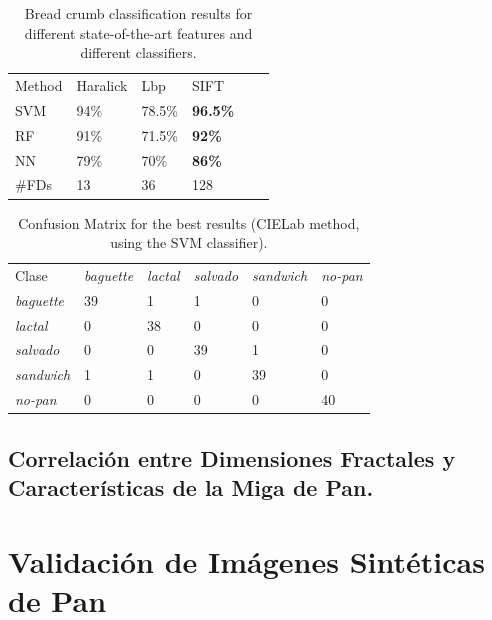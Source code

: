 \begin{table}[h!]
\caption{Bread crumb classification results for different state-of-the-art features and different classifiers.}
\label{tab:other}       %
\begin{tabular}{llllll}
\hline\noalign{\smallskip}
Method & Haralick & Lbp & SIFT\\ %
\noalign{\smallskip}\hline\noalign{\smallskip}
SVM & 94\% & 78.5\% & \textbf{96.5\%} \\ %
RF  & 91\% & 71.5\% & \textbf{92\%} \\ %
NN & 79\% & 70\% & \textbf{86\%} \\ %
\noalign{\smallskip}\hline
\#FDs & 13 & 36 & 128 \\
\hline
\end{tabular}
\end{table}

\begin{table}[h!]
\caption{Confusion Matrix for the best results (CIELab method, using the SVM classifier).}
\label{tab:confusionmatrix}       %
\begin{tabular}{llllll}
\hline\noalign{\smallskip}
Clase&{\em baguette} & {\em lactal} & {\em salvado} &{\em sandwich}&{\em no-pan} \\
\noalign{\smallskip}\hline\noalign{\smallskip}
{\em baguette} & 39& 1 &1 &0 &0 \\
{\em lactal} & 0& 38 &0 &0 &0  \\
{\em salvado} & 0& 0 &39 &1 &0  \\
{\em sandwich} & 1& 1 &0 &39 &0  \\
{\em no-pan} & 0& 0 &0 &0 &40  \\
\hline
\end{tabular}
\end{table}


\subsection{Correlación entre Dimensiones Fractales y Características de la Miga de Pan.}

\section{Validación de Imágenes Sintéticas de Pan}

